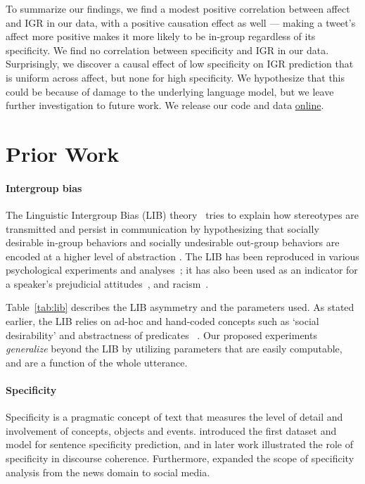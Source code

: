 To summarize our findings, we find a modest positive correlation between affect and IGR in our data, with a positive causation effect as well --- making a tweet's affect more positive makes it more likely to be in-group regardless of its specificity. We find no correlation between specificity and IGR in our data. Surprisingly, we discover a causal effect of low specificity on IGR prediction that is uniform across affect, but none for high specificity. We hypothesize that this could be because of damage to the underlying language model, but we leave further investigation to future work. We release our code and data \href{https://github.com/venkatasg/intergroup-probing}{online}.

\section{Prior Work}

\paragraph{Intergroup bias} The  Linguistic Intergroup Bias  (LIB) theory~\cite{maass_language_1989,maass_linguistic_1999} tries to explain how stereotypes are transmitted and persist in communication by hypothesizing that socially desirable in-group behaviors and socially undesirable out-group behaviors are encoded at a higher level of abstraction . The LIB has been reproduced in various psychological experiments and analyses~\cite{Anolli2006LinguisticIB, gorham_news_2006}; it has also been used as an indicator for a speaker’s prejudicial attitudes~\cite{hippel_linguistic_1997}, and racism~\cite{schnake_modern_1998}. 

Table~\ref{tab:lib} describes the LIB asymmetry and the parameters used. As stated earlier, the LIB relies on ad-hoc and hand-coded concepts such as `social desirability' and abstractness of predicates~\citep{semin_cognitive_1988} . Our proposed experiments \emph{generalize} beyond the LIB by utilizing parameters that are easily computable, and are a function of the whole utterance.

\paragraph{Specificity} Specificity is a pragmatic concept of text that measures the level of detail and involvement of concepts, objects and events. \citet{louis-nenkova-2011-text} introduced the first dataset and model for sentence specificity prediction, and in later work \citet{li_discourse_2017} illustrated the role of specificity in discourse coherence. Furthermore, \citet{gao_predicting_2019} expanded the scope of specificity analysis from the news domain to social media.

